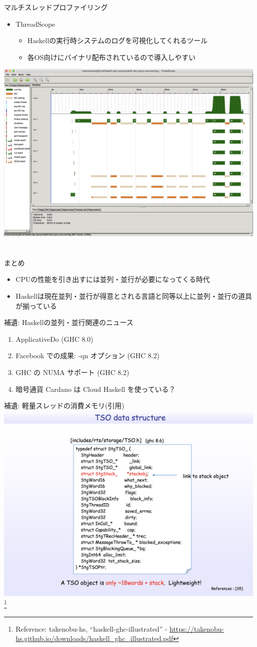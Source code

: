 \documentclass[unicode,12pt]{beamer}
\begin{document}
\begin{frame}{マルチスレッドプロファイリング}
  \begin{itemize}
  \item ThreadScope
    \begin{itemize}
    \item Haskellの実行時システムのログを可視化してくれるツール
    \item 各OS向けにバイナリ配布されているので導入しやすい
    \end{itemize}
  \end{itemize}
  \centering
  \includegraphics[width=.5\textwidth]{pic/threadscope.png}
\end{frame}

\section{}

\begin{frame}{まとめ}
  \begin{itemize}
  \item CPUの性能を引き出すには並列・並行が必要になってくる時代
  \item Haskellは現在並列・並行が得意とされる言語と同等以上に並列・並行の道具が揃っている
  \end{itemize}
\end{frame}

\begin{frame}[plain]{補遺: Haskellの並列・並行関連のニュース}
  \begin{enumerate}
  \item ApplicativeDo (GHC 8.0)
  \item Facebook での成果: -qn オプション (GHC 8.2)
  \item GHC の NUMA サポート (GHC 8.2)
  \item 暗号通貨 Cardano は Cloud Haskell を使っている？
  \end{enumerate}
\end{frame}

\begin{frame}[plain]{補遺: 軽量スレッドの消費メモリ(引用)}
  \centering
  \includegraphics[width=.7\textwidth]{pic/tso.png}
  \footnote{Reference: takenobu-hs, ``haskell-ghc-illustrated'' - \url{https://takenobu-hs.github.io/downloads/haskell_ghc_illustrated.pdf}}
\end{frame}
\end{document}
